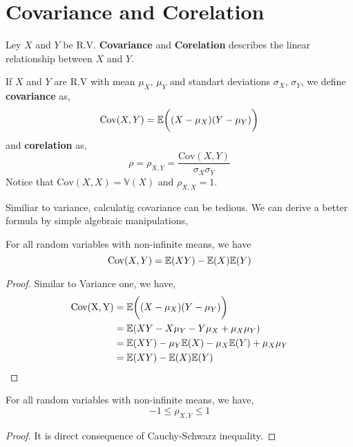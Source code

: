 \section{Covariance and Corelation}
Ley $X$ and $Y$ be R.V.  \textbf{ Covariance} and \textbf{ Corelation} describes the linear relationship between $X$ and $Y$.
\begin{definition}
    If $X$ and $Y$ are R.V with mean $\mu_X$, $\mu_Y$ and standart deviations $\sigma_X$, $\sigma_Y$, we define \textbf{covariance} as,
    \[\mathrm{Cov}(X,Y) = {\mathbb{E}} \bigg((X- \mu_X)(Y - \mu_Y) \bigg)\]
    and \textbf{corelation} as,
    \[\rho = \rho_{X,Y} = \frac{\mathrm{Cov}(X,Y)}{\sigma_X\sigma_Y}\]
    Notice that $\mathrm{Cov}(X,X) = \mathbb{V}(X)$ and $\rho_{X,X} = 1$.
\end{definition}
Similiar to variance, calculatig covariance can be tedious. We can derive a better formula by simple algebraic manipulations,
\begin{theorem}
    For all random variables with non-infinite means, we have
    \[\mathrm{Cov}{(X,Y) = {\mathbb{E}}(XY)-{\mathbb{E}}(X){\mathbb{E}}(Y)}\]
    \begin{proof}
        Similar to Variance one, we have,
        \begin{align*}
                    \mathrm{Cov(X,Y)}  &= {\mathbb{E}} \bigg( (X- \mu_X)(Y - \mu_Y) \bigg)\\
                                        &= {\mathbb{E}} ( XY- X\mu_Y-Y\mu_X+\mu_X\mu_Y ) \\
                                        &= {\mathbb{E}}(XY) - \mu_Y{\mathbb{E}}(X) - \mu_X{\mathbb{E}}(Y) + \mu_X\mu_Y \\ 
                                        &= {\mathbb{E}}(XY) - {\mathbb{E}}(X){\mathbb{E}}(Y)
        \end{align*}
    \end{proof}
\end{theorem}
\begin{theorem}
    For all random variables with non-infinite means, we have,
    \[ -1 \le \rho_{X,Y} \le 1\]
    \begin{proof}
        It is direct consequence of Cauchy-Schwarz inequality.
    \end{proof}
\end{theorem}
